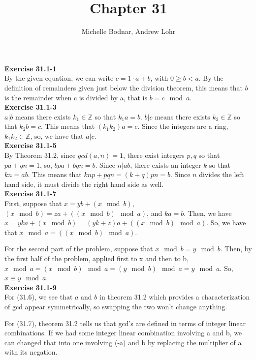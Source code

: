 \documentclass{article}
\title{Chapter 31}
\author{Michelle Bodnar, Andrew Lohr}
\newcommand{\Z}{\mathbb{Z}}
\begin{document}
\maketitle
\noindent\textbf{Exercise 31.1-1}\\
By the given equation, we can write $c = 1\cdot a + b$, with $0\ge b <a$. By the definition of remainders given just below the division theorem, this means that $b$ is the remainder when c is divided by a, that is $b=  c\mod a$.\\



\noindent\textbf{Exercise 31.1-3}\\
$a | b$ means there exists $k_1\in \Z$ so that $k_1 a = b$. $b|c$ means there exists $k_2\in \Z$ so that $k_2 b = c$. This means that $(k_1 k_2) a = c$. Since the integers are a ring, $k_1 k_2 \in \Z$, so, we have that $a | c$.\\



\noindent\textbf{Exercise 31.1-5}\\
By Theorem 31.2, since $gcd(a,n) =1$, there exist integers $p,q$ so that $pa +qn = 1$, so, $bpa+bqn=b$. Since $n | ab$, there exists an integer $k$ so that $kn = ab$. This means that $knp + pqn =(k +q)pn= b$. Since $n$ divides the left hand side, it must divide the right hand side as well.\\



\noindent\textbf{Exercise 31.1-7}\\
First, suppose that $x = yb + (x\mod b)$, $(x\mod b) = za + ((x\mod b)\mod a)$, and $ka =b$. Then, we have $x = yka +(x\mod b) = (yk+ z) a + ((x\mod b)\mod a)$. So, we have that $x\mod a =  ((x\mod b)\mod a)$.

For the second part of the problem, suppose that $ x\mod b = y\mod b$. Then, by the first half of the problem, applied first to x and then to b, $x \mod a = (x\mod b) \mod a = (y\mod b)\mod a = y\mod a$. So, $x \equiv y \mod a$.\\



\noindent\textbf{Exercise 31.1-9}\\
For (31.6), we see that $a$ and $b$ in theorem 31.2 which provides a characterization of gcd appear symmetrically, so swapping the two won't change anything.

For (31.7), theorem 31.2 tells us that gcd's are defined in terms of integer linear combinations. If we had some integer linear combination involving a and b, we can changed that into one involving (-a) and b by replacing the multiplier of a with its negation.
\end{document}
